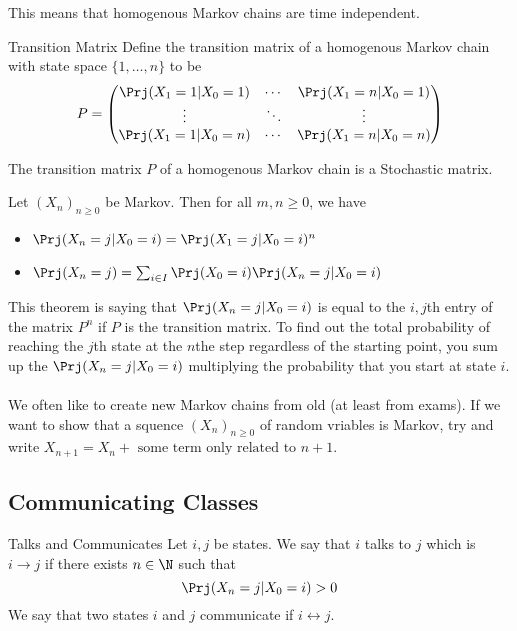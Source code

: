 \documentclass[a4paper]{article}
\begin{document}
This means that homogenous Markov chains are time independent. 

\begin{defn}{Transition Matrix}{} Define the transition matrix of a homogenous Markov chain with state space $\{1,\dots,n\}$ to be $$P=\begin{pmatrix}
\Prj(X_1=1|X_0=1) & \cdots & \Prj(X_1=n|X_0=1)\\
\vdots & \ddots & \vdots\\
\Prj(X_1=1|X_0=n) & \cdots & \Prj(X_1=n|X_0=n)
\end{pmatrix}$$
\end{defn}

\begin{lmm}{}{} The transition matrix $P$ of a homogenous Markov chain is a Stochastic matrix. 
\end{lmm}

\begin{thm}{}{} Let $(X_n)_{n\geq 0}$ be Markov. Then for all $m,n\geq0$, we have
\begin{itemize}
\item $\Prj(X_n=j|X_0=i)=\Prj(X_1=j|X_0=i)^n$
\item $\Prj(X_n=j)=\sum_{i\in I}\Prj(X_0=i)\Prj(X_n=j|X_0=i)$
\end{itemize}
\end{thm}

This theorem is saying that $\Prj(X_n=j|X_0=i)$ is equal to the $i,j$th entry of the matrix $P^n$ if $P$ is the transition matrix. To find out the total probability of reaching the $j$th state at the $n$the step regardless of the starting point, you sum up the $\Prj(X_n=j|X_0=i)$ multiplying the probability that you start at state $i$. \\~\\

We often like to create new Markov chains from old (at least from exams). If we want to show that a squence $(X_n)_{n\geq 0}$ of random vriables is Markov, try and write $X_{n+1}=X_n+\text{ some term only related to }n+1$. 

\subsection{Communicating Classes}
\begin{defn}{Talks and Communicates}{} Let $i,j$ be states. We say that $i$ talks to $j$ which is $i\rightarrow j$ if there exists $n\in\N$ such that $$\Prj(X_n=j|X_0=i)>0$$ We say that two states $i$ and $j$ communicate if $i\leftrightarrow j$. 
\end{defn}
\end{document}
